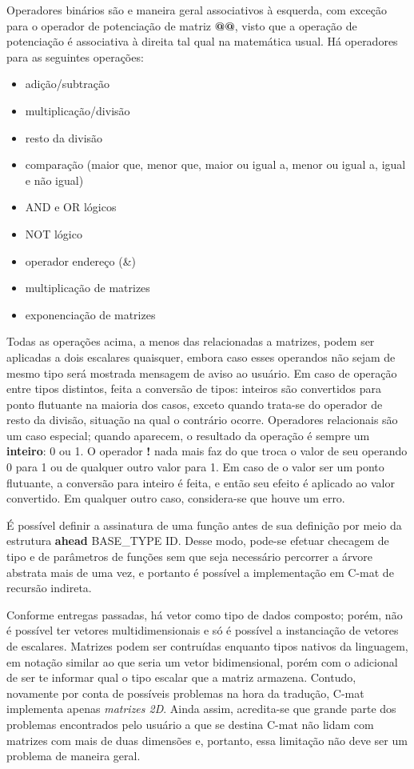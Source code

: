 \documentclass[
	article,			%
	11pt,				%
	oneside,			%
	a4paper,			%
	english,			%
	brazil,				%
	sumario=tradicional
	]{abntex2}
\renewcommand{\it}[1]{\textit{#1}}
\renewcommand{\bf}[1]{\textbf{#1}}
\begin{document}
Operadores binários são e maneira geral associativos à esquerda, com exceção para o operador de potenciação de matriz \bf{@@}, visto que a operação de potenciação é associativa à direita tal qual na matemática usual. Há operadores para as seguintes operações:
\begin{itemize}
	\item adição/subtração
	\item multiplicação/divisão
	\item resto da divisão
	\item comparação (maior que, menor que, maior ou igual a, menor ou igual a, igual e não igual)
	\item AND e OR lógicos
	\item NOT lógico
	\item operador endereço (\&)
	\item multiplicação de matrizes
	\item exponenciação de matrizes
\end{itemize}

Todas as operações acima, a menos das relacionadas a matrizes, podem ser aplicadas a dois escalares quaisquer, embora caso esses operandos não sejam de mesmo tipo será mostrada mensagem de aviso ao usuário. Em caso de operação entre tipos distintos, feita a conversão de tipos: inteiros são convertidos para ponto flutuante na maioria dos casos, exceto quando trata-se do operador de resto da divisão, situação na qual o contrário ocorre. Operadores relacionais são um caso especial; quando aparecem, o resultado da operação é sempre um \bf{inteiro}: 0 ou 1. O operador \bf{!} nada mais faz do que troca o valor de seu operando 0 para 1 ou de qualquer outro valor para 1. Em caso de o valor ser um ponto flutuante, a conversão para inteiro é feita, e então seu efeito é aplicado ao valor convertido. Em qualquer outro caso, considera-se que houve um erro.

É possível definir a assinatura de uma função antes de sua definição por meio da estrutura \bf{ahead} BASE\_TYPE ID. Desse modo, pode-se efetuar checagem de tipo e de parâmetros de funções sem que seja necessário percorrer a árvore abstrata mais de uma vez, e portanto é possível a implementação em C-mat de recursão indireta.

Conforme entregas passadas, há vetor como tipo de dados composto; porém, não é possível ter vetores multidimensionais e só é possível a instanciação de vetores de escalares. Matrizes podem ser contruídas
enquanto tipos nativos da linguagem, em notação similar ao que seria um vetor bidimensional, porém com o
adicional de ser te informar qual o tipo escalar que a matriz armazena. Contudo, novamente por conta de
possíveis problemas na hora da tradução, C-mat implementa apenas \it{matrizes 2D}. Ainda assim,
acredita-se que grande parte dos problemas encontrados pelo usuário a que se destina C-mat não lidam com
matrizes com mais de duas dimensões e, portanto, essa limitação não deve ser um problema de maneira
geral.
\end{document}
